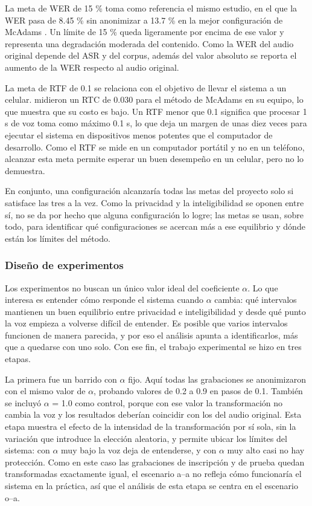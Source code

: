 \documentclass[10pt,twocolumn]{article}
\newcommand{\textcite}[1]{\citet{#1}}
\newcommand{\parencite}[1]{\citep{#1}}
\begin{document}
La meta de WER de 15 \% toma como referencia el mismo estudio, en el que la WER pasa de 8.45 \% sin anonimizar a 13.7 \% en la mejor configuración de McAdams \parencite{patino2021}. Un límite de 15 \% queda ligeramente por encima de ese valor y representa una degradación moderada del contenido. Como la WER del audio original depende del ASR y del corpus, además del valor absoluto se reporta el aumento de la WER respecto al audio original.

La meta de RTF de 0.1 se relaciona con el objetivo de llevar el sistema a un celular. \textcite{deng2023} midieron un RTC de 0.030 para el método de McAdams en su equipo, lo que muestra que su costo es bajo. Un RTF menor que 0.1 significa que procesar 1 s de voz toma como máximo 0.1 s, lo que deja un margen de unas diez veces para ejecutar el sistema en dispositivos menos potentes que el computador de desarrollo. Como el RTF se mide en un computador portátil y no en un teléfono, alcanzar esta meta permite esperar un buen desempeño en un celular, pero no lo demuestra.

En conjunto, una configuración alcanzaría todas las metas del proyecto solo si satisface las tres a la vez. Como la privacidad y la inteligibilidad se oponen entre sí, no se da por hecho que alguna configuración lo logre; las metas se usan, sobre todo, para identificar qué configuraciones se acercan más a ese equilibrio y dónde están los límites del método.

\subsubsection{Diseño de experimentos}\label{sec:3.6.3}

Los experimentos no buscan un único valor ideal del coeficiente $\alpha$. Lo que interesa es entender cómo responde el sistema cuando $\alpha$ cambia: qué intervalos mantienen un buen equilibrio entre privacidad e inteligibilidad y desde qué punto la voz empieza a volverse difícil de entender. Es posible que varios intervalos funcionen de manera parecida, y por eso el análisis apunta a identificarlos, más que a quedarse con uno solo. Con ese fin, el trabajo experimental se hizo en tres etapas.

La primera fue un barrido con $\alpha$ fijo. Aquí todas las grabaciones se anonimizaron con el mismo valor de $\alpha$, probando valores de 0.2 a 0.9 en pasos de 0.1. También se incluyó $\alpha$ = 1.0 como control, porque con ese valor la transformación no cambia la voz y los resultados deberían coincidir con los del audio original. Esta etapa muestra el efecto de la intensidad de la transformación por sí sola, sin la variación que introduce la elección aleatoria, y permite ubicar los límites del sistema: con $\alpha$ muy bajo la voz deja de entenderse, y con $\alpha$ muy alto casi no hay protección. Como en este caso las grabaciones de inscripción y de prueba quedan transformadas exactamente igual, el escenario a--a no refleja cómo funcionaría el sistema en la práctica, así que el análisis de esta etapa se centra en el escenario o--a.
\end{document}
